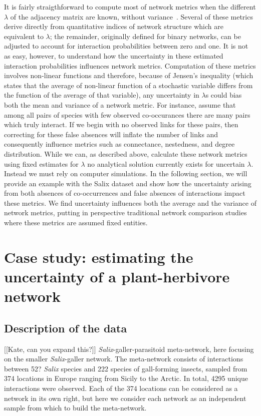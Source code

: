 \documentclass[12pt]{article}
\begin{document}
    It is fairly straigthforward to compute most of network metrics when the different $\lambda$ of the adjacency matrix are known, without variance~\citep{Poisot2016}. Several of these metrics derive directly from quantitative indices of network structure which are equivalent to $\lambda$; the remainder, originally defined for binary networks, can be adjusted to account for interaction probabilities between zero and one. It is not as easy, however, to understand how the uncertainty in these estimated interaction probabilities influences network metrics. Computation of these metrics involves non-linear functions and therefore, because of Jensen's inequality (which states that the average of non-linear function of a stochastic variable differs from the function of the average of that variable), any uncertainty in $\lambda$s could bias both the mean and variance of a network metric. For instance, assume that among all pairs of species with few observed co-occurances there are many pairs which truly interact.    If we begin with no observed links for these pairs, then correcting for these false absences will inflate the number of links and consequently influence metrics such as connectance, nestedness, and degree distribution. While we can, as described above, calculate these network metrics using fixed estimates for $\lambda$ no analytical solution currently exists for uncertain $\lambda$. Instead we must rely on computer simulations. In the following section, we will provide an example with the Salix dataset and show how the uncertainty arising from both absences of co-occurrences and false absences of interactions impact these metrics. We find uncertainty influences both the average and the variance of network metrics, putting in perspective traditional network comparison studies where these metrics are assumed fixed entities. 

\section*{Case study: estimating the uncertainty of a plant-herbivore network}

    \subsection*{Description of the data}

      [[Kate, can you expand this?]]
      \emph{Salix}-galler-parasitoid meta-network, here focusing on the smaller \emph{Salix}-galler network. The meta-network consists of interactions between 52? \emph{Salix} species and 222 species of gall-forming insects, sampled from 374 locations in Europe ranging from Sicily to the Arctic. In total, 4295 unique interactions were observed. Each of the 374 locations can be considered as a network in its own right, but here we consider each network as an independent sample from which to build the meta-network.
\end{document}
